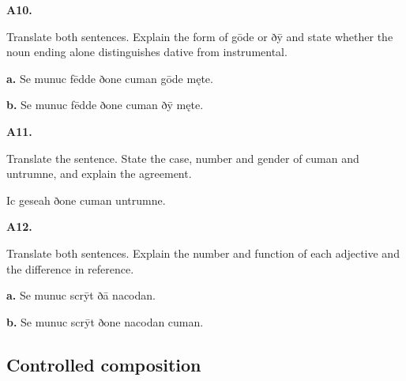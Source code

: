 \par\begin{minipage}{\linewidth}\raggedright
\textbf{A10.}

Translate both sentences. Explain the form of gōde or ðȳ and state whether the noun ending alone distinguishes dative from instrumental.

\textbf{a.} Se munuc fēdde ðone cuman gōde męte.

\textbf{b.} Se munuc fēdde ðone cuman ðȳ męte.

\end{minipage}\par\addvspace{4pt}

\par\begin{minipage}{\linewidth}\raggedright
\textbf{A11.}

Translate the sentence. State the case, number and gender of cuman and untrumne, and explain the agreement.

Ic geseah ðone cuman untrumne.

\end{minipage}\par\addvspace{4pt}

\par\begin{minipage}{\linewidth}\raggedright
\textbf{A12.}

Translate both sentences. Explain the number and function of each adjective and the difference in reference.

\textbf{a.} Se munuc scrȳt ðā nacodan.

\textbf{b.} Se munuc scrȳt ðone nacodan cuman.

\end{minipage}\par\addvspace{4pt}

\subsection*{Controlled composition}


